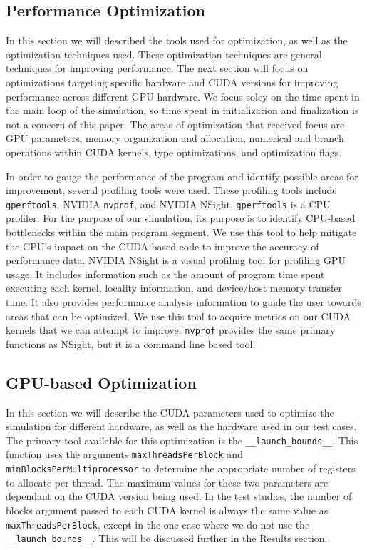\documentclass[10pt]{IEEEtran}
\newcommand{\?}{\stackrel{?}{=}}
\begin{document}
\subsection{Performance Optimization}
In this section we will described the tools used for optimization, as well 
as the optimization techniques used. These optimization techniques are general
techniques for improving performance. The next section will focus on optimizations
targeting specific hardware and CUDA versions for improving performance across
different GPU hardware. We focus soley on the time spent in the main loop of 
the simulation, so time spent in initialization and finalization is not a concern
of this paper. The areas of optimization that received focus are GPU parameters,
memory organization and allocation, numerical and branch operations within 
CUDA kernels, type optimizations, and optimization flags.

In order to gauge the performance of the program and identify possible areas
for improvement, several profiling tools were used. These profiling tools 
include \texttt{gperftools}\cite{gperftools}, NVIDIA \texttt{nvprof}\cite{nvprof}, and NVIDIA 
NSight\cite{nsight}. \texttt{gperftools} is a CPU profiler. For the purpose
of our simulation, its purpose is to identify CPU-based bottlenecks within the
main program segment. We use this tool to help mitigate the CPU's impact on the CUDA-based
code to improve the accuracy of performance data. NVIDIA NSight is a visual
profiling tool for profiling GPU usage. It includes information such as the 
amount of program time spent executing each kernel, locality information,
and device/host memory transfer time. It also provides performance analysis 
information to guide the user towards areas that can be optimized. We use this 
tool to acquire metrics on our CUDA kernels that we can attempt to improve.
\texttt{nvprof} provides the same primary functions as NSight, but it is a 
command line based tool.

\subsection{GPU-based Optimization}
In this section we will describe the CUDA parameters used to optimize the 
simulation for different hardware, as well as the hardware used in our test
cases. The primary tool available for this 
optimization is the \texttt{\_\_launch\_bounds\_\_}\cite{bounds}. This function uses the 
arguments \texttt{maxThreadsPerBlock} and \texttt{minBlocksPerMultiprocessor}
to determine the appropriate number of registers to allocate per thread\cite{bounds}. The
maximum values for these two parameters are dependant on the CUDA version 
being used. In the test studies, the number of blocks argument passed to each
CUDA kernel is always the same value as \texttt{maxThreadsPerBlock}, except
in the one case where we do not use the \texttt{\_\_launch\_bounds\_\_}\cite{bounds}.
This will be discussed further in the Results section.
\end{document}
